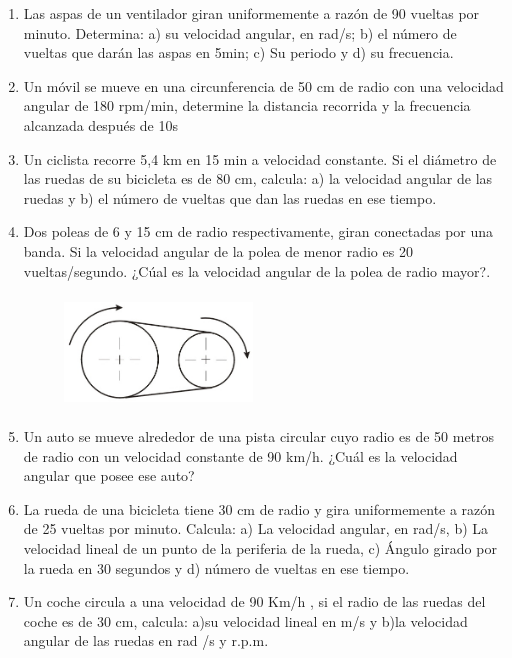 \begin{enumerate}
\item Las aspas de un ventilador giran uniformemente a razón de 90 vueltas por minuto. Determina: a) su velocidad angular, en 
rad/s; b) el número de vueltas que darán las aspas en 5min; c) Su periodo y d) su frecuencia.

\item Un móvil se mueve en una circunferencia de 50 cm de radio con una velocidad angular de 180 rpm/min, determine la distancia 
recorrida y la frecuencia alcanzada después de 10s

 \item Un ciclista recorre 5,4 km en 15 min a velocidad constante. Si el diámetro de las ruedas de su bicicleta es de 80 cm, 
calcula: a) la velocidad angular de las ruedas y b) el número de vueltas que dan las ruedas en ese tiempo.

\item Dos poleas de 6 y 15 cm de radio respectivamente, giran conectadas por una banda. Si la velocidad angular de la polea de 
menor radio es 20 vueltas/segundo. ¿Cúal es la velocidad angular de la polea de radio mayor?.
\begin{figure}[H]
 \centering
\includegraphics[width=5.0cm,height=3.0cm]{images/poleas.jpg}
\end{figure}

\item Un auto se mueve alrededor de una pista circular cuyo radio es de 50 metros de radio con un velocidad constante de 90 km/h.
 ¿Cuál es la velocidad angular que posee ese auto?
 
\item La rueda de una bicicleta tiene 30 cm de radio y gira uniformemente a razón de 25 vueltas por minuto. Calcula: a) La 
velocidad angular, en rad/s, b) La velocidad lineal de un punto de la periferia de la rueda, c) Ángulo girado por la rueda en 30 
segundos y d) número de vueltas en ese tiempo.

\item Un coche circula a una velocidad de 90 Km/h , si el radio de las ruedas del coche es de 30 cm, calcula: a)su velocidad 
lineal en m/s y b)la velocidad angular de las ruedas en rad /s y r.p.m.


\end{enumerate}
